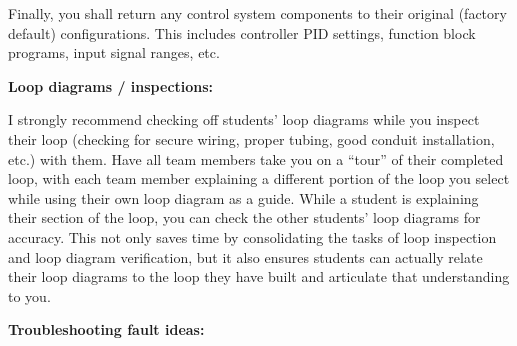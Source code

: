 \vskip 10pt

Finally, you shall return any control system components to their original (factory default) configurations.  This includes controller PID settings, function block programs, input signal ranges, etc.
















\noindent
{\bf Loop diagrams / inspections:}

I strongly recommend checking off students' loop diagrams while you inspect their loop (checking for secure wiring, proper tubing, good conduit installation, etc.) with them.  Have all team members take you on a ``tour'' of their completed loop, with each team member explaining a different portion of the loop you select while using their own loop diagram as a guide.  While a student is explaining their section of the loop, you can check the other students' loop diagrams for accuracy.  This not only saves time by consolidating the tasks of loop inspection and loop diagram verification, but it also ensures students can actually relate their loop diagrams to the loop they have built and articulate that understanding to you.

\vskip 10pt

\goodbreak

{\bf Troubleshooting fault ideas:}


